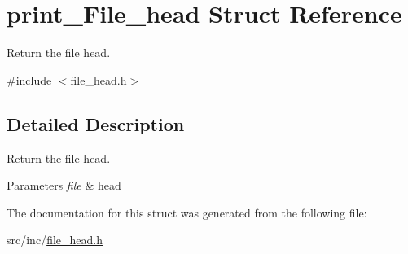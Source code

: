 \hypertarget{structprint___file__head}{}\section{print\+\_\+\+File\+\_\+head Struct Reference}
\label{structprint___file__head}


Return the file head.  




{\ttfamily \#include $<$file\+\_\+head.\+h$>$}



\subsection{Detailed Description}
Return the file head. 


\begin{DoxyParams}{Parameters}
{\em file} & head \\
\hline
\end{DoxyParams}


The documentation for this struct was generated from the following file\+:\begin{DoxyCompactItemize}
\item 
src/inc/\mbox{\hyperlink{file__head_8h}{file\+\_\+head.\+h}}\end{DoxyCompactItemize}
